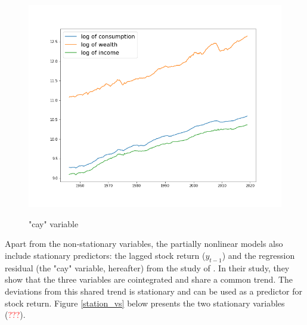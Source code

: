 \documentclass[a4paper,12pt,times,numbered,print,index]{report}
\numberwithin{equation}{section}
\begin{document}
\begin{figure}[!htbp]
	\centering
	\caption{"cay" variable}
	\includegraphics[width=0.5\linewidth]{plots/cay.png}
	\label{cay}
\end{figure}

Apart from the non-stationary variables, the partially nonlinear models also include stationary predictors: the lagged stock return ($y_{t-1}$) and the regression residual (the "cay" variable, hereafter) from the study of \cite{lettau2001consumption}. In their study, they show that the three variables are cointegrated and share a common trend. The deviations from this shared trend is stationary and can be used as a predictor for stock return. Figure \ref{station_vs} below presents the two stationary variables (\textcolor{red}{???}). 
\end{document}
